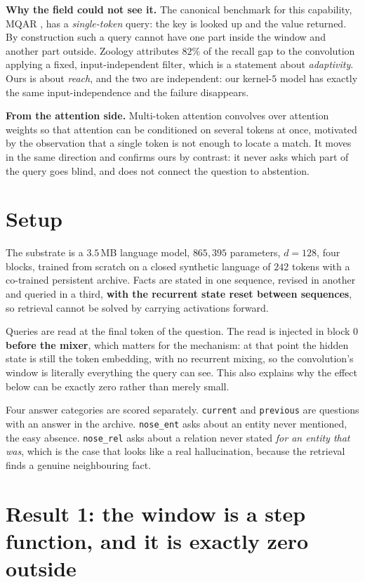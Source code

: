\documentclass[11pt,a4paper]{article}
\begin{document}
\textbf{Why the field could not see it.} The canonical benchmark for this capability, MQAR
\citep{zoology}, has a \emph{single-token} query: the key is looked up and the value returned. By
construction such a query cannot have one part inside the window and another part outside. Zoology
attributes $82\%$ of the recall gap to the convolution applying a fixed, input-independent filter, which
is a statement about \emph{adaptivity}. Ours is about \emph{reach}, and the two are independent: our
kernel-$5$ model has exactly the same input-independence and the failure disappears.

\textbf{From the attention side.} Multi-token attention \citep{mta} convolves over attention weights so
that attention can be conditioned on several tokens at once, motivated by the observation that a single
token is not enough to locate a match. It moves in the same direction and confirms ours by contrast: it
never asks which part of the query goes blind, and does not connect the question to abstention.

\section{Setup}

The substrate is a $3.5$\,MB language model, $865{,}395$ parameters, $d=128$, four blocks, trained from
scratch on a closed synthetic language of $242$ tokens with a co-trained persistent archive. Facts are
stated in one sequence, revised in another and queried in a third, \textbf{with the recurrent state
reset between sequences}, so retrieval cannot be solved by carrying activations forward.

Queries are read at the final token of the question. The read is injected in block $0$
\textbf{before the mixer}, which matters for the mechanism: at that point the hidden state is still the
token embedding, with no recurrent mixing, so the convolution's window is literally everything the
query can see. This also explains why the effect below can be exactly zero rather than merely small.

Four answer categories are scored separately. \texttt{current} and \texttt{previous} are questions with
an answer in the archive. \texttt{nose\_ent} asks about an entity never mentioned, the easy absence.
\texttt{nose\_rel} asks about a relation never stated \emph{for an entity that was}, which is the case
that looks like a real hallucination, because the retrieval finds a genuine neighbouring fact.

\section{Result 1: the window is a step function, and it is exactly zero outside}
\end{document}
